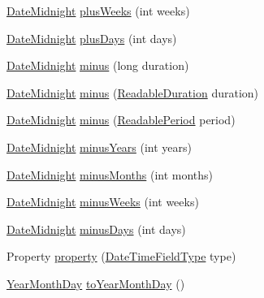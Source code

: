 \begin{DoxyCompactItemize}
\hyperlink{classorg_1_1joda_1_1time_1_1_date_midnight}{Date\-Midnight} \hyperlink{classorg_1_1joda_1_1time_1_1_date_midnight_abecd6651b3ecf422565ed5387e7083d7}{plus\-Weeks} (int weeks)
\item 
\hyperlink{classorg_1_1joda_1_1time_1_1_date_midnight}{Date\-Midnight} \hyperlink{classorg_1_1joda_1_1time_1_1_date_midnight_a137a994f0bcae382f04458d447a2e0ea}{plus\-Days} (int days)
\item 
\hyperlink{classorg_1_1joda_1_1time_1_1_date_midnight}{Date\-Midnight} \hyperlink{classorg_1_1joda_1_1time_1_1_date_midnight_ae540e6051564be3696aea63e925b108f}{minus} (long duration)
\item 
\hyperlink{classorg_1_1joda_1_1time_1_1_date_midnight}{Date\-Midnight} \hyperlink{classorg_1_1joda_1_1time_1_1_date_midnight_aef88c53971b5f17c74b275de1f8c31c4}{minus} (\hyperlink{interfaceorg_1_1joda_1_1time_1_1_readable_duration}{Readable\-Duration} duration)
\item 
\hyperlink{classorg_1_1joda_1_1time_1_1_date_midnight}{Date\-Midnight} \hyperlink{classorg_1_1joda_1_1time_1_1_date_midnight_a6180e554b44ba50c60852598c07e08b5}{minus} (\hyperlink{interfaceorg_1_1joda_1_1time_1_1_readable_period}{Readable\-Period} period)
\item 
\hyperlink{classorg_1_1joda_1_1time_1_1_date_midnight}{Date\-Midnight} \hyperlink{classorg_1_1joda_1_1time_1_1_date_midnight_a10bf3f508afb5c1b6c7c13c768e50701}{minus\-Years} (int years)
\item 
\hyperlink{classorg_1_1joda_1_1time_1_1_date_midnight}{Date\-Midnight} \hyperlink{classorg_1_1joda_1_1time_1_1_date_midnight_a18b4c6e6ce03bfe7e0c7bb6ae0965548}{minus\-Months} (int months)
\item 
\hyperlink{classorg_1_1joda_1_1time_1_1_date_midnight}{Date\-Midnight} \hyperlink{classorg_1_1joda_1_1time_1_1_date_midnight_aca29b63a769f7c5fa0f88dd1fad656d8}{minus\-Weeks} (int weeks)
\item 
\hyperlink{classorg_1_1joda_1_1time_1_1_date_midnight}{Date\-Midnight} \hyperlink{classorg_1_1joda_1_1time_1_1_date_midnight_af6967a4d7b71bba122621621fff425ac}{minus\-Days} (int days)
\item 
Property \hyperlink{classorg_1_1joda_1_1time_1_1_date_midnight_ad0ab67e2ebe04b68c506c6944d50f8ad}{property} (\hyperlink{classorg_1_1joda_1_1time_1_1_date_time_field_type}{Date\-Time\-Field\-Type} type)
\item 
\hyperlink{classorg_1_1joda_1_1time_1_1_year_month_day}{Year\-Month\-Day} \hyperlink{classorg_1_1joda_1_1time_1_1_date_midnight_a78b0af9757e761162674fa9263c1eb53}{to\-Year\-Month\-Day} ()

\end{DoxyCompactItemize}
